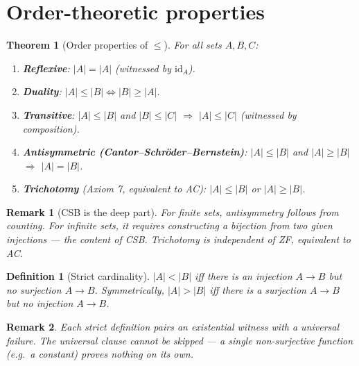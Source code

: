 \documentclass[11pt]{article}
\theoremstyle{defstyle}
\newtheorem{definition}{Definition}[section]
\theoremstyle{thmstyle}
\newtheorem{theorem}{Theorem}[section]
\theoremstyle{notstyle}
\newtheorem*{remark}{Remark}
\theoremstyle{cautionstyle}
\newcommand{\id}{\mathrm{id}}
\newcommand{\card}[1]{\lvert #1 \rvert}
\begin{document}
\section{Order-theoretic properties}

\begin{thmbox}
\begin{theorem}[Order properties of $\leq$]
For all sets $A, B, C$:
\begin{enumerate}[label=\textnormal{(\roman*)}, leftmargin=2em, itemsep=2pt]
  \item \textbf{Reflexive}: $\card{A} = \card{A}$ \;(witnessed by $\id_A$).
  \item \textbf{Duality}: $\card{A} \leq \card{B} \iff \card{B} \geq \card{A}$.
  \item \textbf{Transitive}: $\card{A} \leq \card{B}$ and $\card{B} \leq \card{C}$
        $\Rightarrow$ $\card{A} \leq \card{C}$ \;(witnessed by composition).
  \item \textbf{Antisymmetric (Cantor--Schröder--Bernstein)}:
        $\card{A} \leq \card{B}$ and $\card{A} \geq \card{B}$
        $\Rightarrow$ $\card{A} = \card{B}$.
  \item \textbf{Trichotomy} (Axiom 7, equivalent to AC):
        $\card{A} \leq \card{B}$ or $\card{A} \geq \card{B}$.
\end{enumerate}
\end{theorem}
\end{thmbox}

\begin{notebox}
\begin{remark}[CSB is the deep part]
For finite sets, antisymmetry follows from counting.  For infinite sets,
it requires \emph{constructing} a bijection from two given injections ---
the content of CSB.  Trichotomy is independent of ZF, equivalent to AC.
\end{remark}
\end{notebox}

\begin{defbox}
\begin{definition}[Strict cardinality]
$\card{A} < \card{B}$ iff there is an injection $A \to B$ but no
surjection $A \to B$.  Symmetrically, $\card{A} > \card{B}$ iff there is
a surjection $A \to B$ but no injection $A \to B$.
\end{definition}
\end{defbox}

\begin{notebox}
\begin{remark}
Each strict definition pairs an existential witness with a universal
failure.  The universal clause cannot be skipped --- a single
non-surjective function (e.g.\ a constant) proves nothing on its own.
\end{remark}
\end{notebox}
\end{document}
